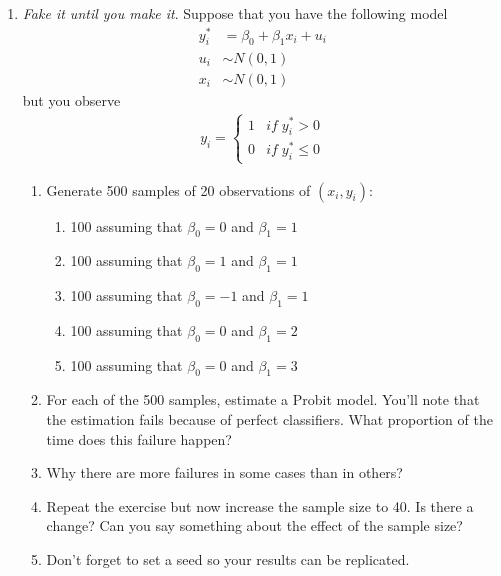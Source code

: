 \documentclass[12pt,onecolumn,A4]{article}
\begin{document}
\begin{enumerate}
  \item {\it Fake it until you make it}. Suppose that you have the following model
  \begin{align}
  y^*_i &= \beta_0 + \beta_1 x_i + u_i \\
  u_i &\sim N(0,1) \\
  x_i &\sim N(0,1)
  \end{align}
  but you observe
  \begin{align}
  y_{i}=\begin{cases}
1 & if\;y_{i}^{*}>0\\
0 & if\;y_{i}^{*}\leq0
\end{cases}
  \end{align}
  \begin{enumerate}
  \item Generate 500 samples of 20 observations of $(x_i,y_i)$:
  \begin{enumerate}
  \item 100 assuming that $\beta_0=0$ and $\beta_1 =1 $
  \item 100 assuming that $\beta_0=1$ and $\beta_1 =1 $
  \item 100 assuming that $\beta_0=-1$ and $\beta_1 =1 $
  \item 100 assuming that $\beta_0=0$ and $\beta_1 =2 $
  \item 100 assuming that $\beta_0=0$ and $\beta_1 =3$
  \end{enumerate}
  
  \item For each of the 500 samples, estimate a Probit model. You'll note that the estimation fails because of perfect classifiers. What proportion of the time does this failure happen?
  \item Why there are more failures in some cases than in others?
  \item Repeat the exercise but now increase the sample size to 40. Is there a change? Can you say something about the effect of the sample size?
  \item Don't forget to set a seed so your results can be replicated.
  \end{enumerate}


\end{enumerate}
\end{document}
